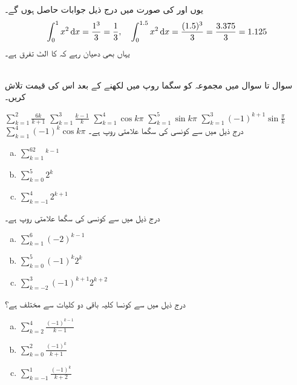 یوں  اور  کی صورت میں درج ذیل جوابات حاصل ہوں گے۔
\begin{align*}
\int_0^1x^2\dif x=\frac{1^3}{3}=\frac{1}{3},\quad \int_0^{1.5}x^2\dif x=\frac{(1.5)^3}{3}=\frac{3.375}{3}=1.125
\end{align*}
یہاں بھی دھیان رہے کہ  کا الٹ تفرق  ہے۔

\\
سوال  تا سوال  میں مجموعہ کو سگما روپ میں لکھنے کے بعد اس کی قیمت تلاش کریں۔

$\sum\limits_{k=1}^2\tfrac{6k}{k+1}$
$\sum\limits_{k=1}^3\tfrac{k-1}{k}$
$\sum\limits_{k=1}^4\cos k\pi$
$\sum\limits_{k=1}^5\sin k\pi$
$\sum\limits_{k=1}^3(-1)^{k+1}\sin\tfrac{\pi}{k}$
$\sum\limits_{k=1}^4 (-1)^k\cos k\pi$
درج ذیل میں سے کونسی  کی سگما علامتی روپ ہے۔
\begin{multicols}{3}
\begin{enumerate}[a.]
\item
$\sum\limits_{k=1}^62^{k-1}$
\item
$\sum\limits_{k=0}^5 2^k$
\item
$\sum\limits_{k=-1}^4 2^{k+1}$
\end{enumerate}
\end{multicols}
درج ذیل میں سے کونسی  کی سگما علامتی روپ ہے۔
\begin{multicols}{3}
\begin{enumerate}[a.]
\item
$\sum\limits_{k=1}^6(-2)^{k-1}$\\
\item
$\sum\limits_{k=0}^5 (-1)^k2^k$
\item
$\sum\limits_{k=-2}^3 (-1)^{k+1}2^{k+2}$
\end{enumerate}
\end{multicols}
درج ذیل میں سے کونسا کلیہ باقی دو کلیات سے مختلف ہے؟
\begin{multicols}{3}
\begin{enumerate}[a.]
\item
$\sum\limits_{k=2}^4 \tfrac{(-1)^{k-1}}{k-1}$
\item
$\sum\limits_{k=0}^2 \tfrac{(-1)^k}{k+1}$
\item
$\sum\limits_{k=-1}^1 \tfrac{(-1)^k}{k+2}$
\end{enumerate}
\end{multicols}
